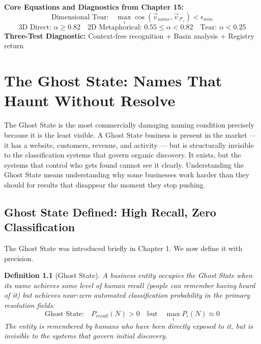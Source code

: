 \documentclass[12pt, openany]{book}
\theoremstyle{thmstyle}
\theoremstyle{defstyle}
\newtheorem{definition}{Definition}[chapter]
\begin{document}
\begin{equationbox}
\textbf{Core Equations and Diagnostics from Chapter 15:}
\[
\text{Dimensional Tear:} \quad \max_i \cos(\vec{v}_{name}, \vec{v}_{\mathcal{F}_i}) < \epsilon_{min}
\]
\[
\text{3D Direct: } \alpha \geq 0.82 \quad \text{2D Metaphorical: } 0.55 \leq \alpha < 0.82 \quad \text{Tear: } \alpha < 0.25
\]
\textbf{Three-Test Diagnostic:} Context-free recognition + Basin analysis + Registry return
\end{equationbox}

\chapter{The Ghost State: Names That Haunt Without Resolve}

\begin{keybox}
The Ghost State is the most commercially damaging naming condition precisely because it is the least visible. A Ghost State business is present in the market --- it has a website, customers, revenue, and activity --- but is structurally invisible to the classification systems that govern organic discovery. It exists, but the systems that control who gets found cannot see it clearly. Understanding the Ghost State means understanding why some businesses work harder than they should for results that disappear the moment they stop pushing.
\end{keybox}

\section{Ghost State Defined: High Recall, Zero Classification}

The Ghost State was introduced briefly in Chapter 1. We now define it with precision.

\begin{definition}[Ghost State]
A business entity occupies the Ghost State when its name achieves some level of human recall (people can remember having heard of it) but achieves near-zero automated classification probability in the primary resolution fields:
\begin{equation}
\text{Ghost State:} \quad P_{recall}(N) > 0 \quad \text{but} \quad \max_i P_i(N) \approx 0
\label{eq:ghost}
\end{equation}
The entity is remembered by humans who have been directly exposed to it, but is invisible to the systems that govern initial discovery.
\end{definition}
\end{document}
